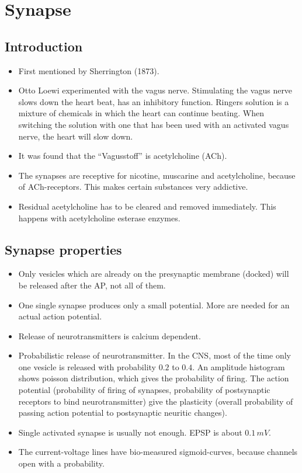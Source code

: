 \documentclass[main]{subfiles}
\begin{document}

\section{Synapse}
\subsection{Introduction}
\begin{itemize}[noitemsep,nolistsep]
	\item First mentioned by Sherrington (1873).
	\item Otto Loewi experimented with the vagus nerve.
	\subitem Stimulating the vagus nerve slows down the heart beat, has an inhibitory function.
	\subitem Ringers solution is a mixture of chemicals in which the heart can continue beating.
	\subitem When switching the solution with one that has been used with an activated vagus nerve, the heart will slow down.
	\item It was found that the ``Vagusstoff'' is acetylcholine (ACh).
	\item The synapses are receptive for nicotine, muscarine and acetylcholine, because of ACh-receptors. This makes certain substances very addictive.
	\item Residual acetylcholine has to be cleared and removed immediately. This happens with acetylcholine esterase enzymes.
\end{itemize}

\subsection{Synapse properties}
\begin{itemize}[noitemsep,nolistsep]
	\item Only vesicles which are already on the presynaptic membrane (docked) will be released after the AP, not all of them.
	\item One single synapse produces only a small potential. More are needed for an actual action potential.
	\item Release of neurotransmitters is calcium dependent.
	\item Probabilistic release of neurotransmitter.
	\subitem In the CNS, most of the time only one vesicle is released with probability $0.2$ to $0.4$.
	\subitem An amplitude histogram shows poisson distribution, which gives the probability of firing.
	\subitem The action potential (probability of firing of synapses, probability of postsynaptic receptors to bind neurotransmitter) give the plasticity (overall probability of passing action potential to postsynaptic neuritic changes).
	\item Single activated synapse is usually not enough. EPSP is about $0.1\,mV$.
	\item The current-voltage lines have bio-measured sigmoid-curves, because channels open with a probability.
\end{itemize}
\end{document}

